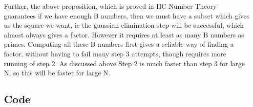 \documentclass[10pt,a4paper]{report}
\begin{document}
Further, the above proposition, which is proved in IIC Number Theory guarantees if we have enough B numbers, then we must have a subset which gives us the square we want, ie the gaussian elimination step will be successful, which almost always gives a factor. However it requires at least as many B numbers as primes. Computing all these B numbers first  gives a reliable way of finding a factor, without having to fail many step 3 attempts, though requires more running of step 2. As discussed above Step 2 is much faster than step 3 for large N, so this will be faster for large N.

\newpage

\subsection*{Code}
\end{document}
